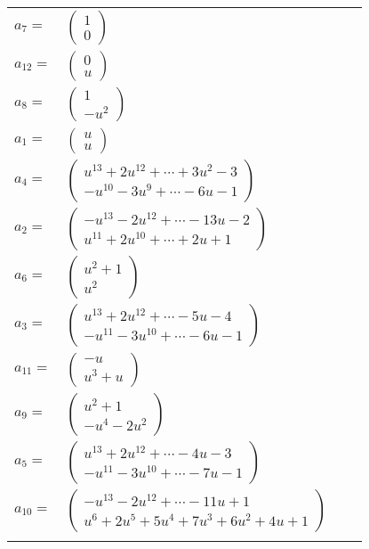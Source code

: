 \documentclass[1p]{elsarticle_modified}
\theoremstyle{definition}
\begin{document}
\begin{tabular}{m{7pt} m{180pt} m{7pt} m{180pt} }
\flushright $a_{7}=$&$\begin{pmatrix}1\\0\end{pmatrix}$ \\
\flushright $a_{12}=$&$\begin{pmatrix}0\\u\end{pmatrix}$ \\
\flushright $a_{8}=$&$\begin{pmatrix}1\\- u^2\end{pmatrix}$ \\
\flushright $a_{1}=$&$\begin{pmatrix}u\\u\end{pmatrix}$ \\
\flushright $a_{4}=$&$\begin{pmatrix}u^{13}+2 u^{12}+\cdots+3 u^2-3\\- u^{10}-3 u^9+\cdots-6 u-1\end{pmatrix}$ \\
\flushright $a_{2}=$&$\begin{pmatrix}- u^{13}-2 u^{12}+\cdots-13 u-2\\u^{11}+2 u^{10}+\cdots+2 u+1\end{pmatrix}$ \\
\flushright $a_{6}=$&$\begin{pmatrix}u^2+1\\u^2\end{pmatrix}$ \\
\flushright $a_{3}=$&$\begin{pmatrix}u^{13}+2 u^{12}+\cdots-5 u-4\\- u^{11}-3 u^{10}+\cdots-6 u-1\end{pmatrix}$ \\
\flushright $a_{11}=$&$\begin{pmatrix}- u\\u^3+u\end{pmatrix}$ \\
\flushright $a_{9}=$&$\begin{pmatrix}u^2+1\\- u^4-2 u^2\end{pmatrix}$ \\
\flushright $a_{5}=$&$\begin{pmatrix}u^{13}+2 u^{12}+\cdots-4 u-3\\- u^{11}-3 u^{10}+\cdots-7 u-1\end{pmatrix}$ \\
\flushright $a_{10}=$&$\begin{pmatrix}- u^{13}-2 u^{12}+\cdots-11 u+1\\u^6+2 u^5+5 u^4+7 u^3+6 u^2+4 u+1\end{pmatrix}$\\&\end{tabular}
\end{document}

